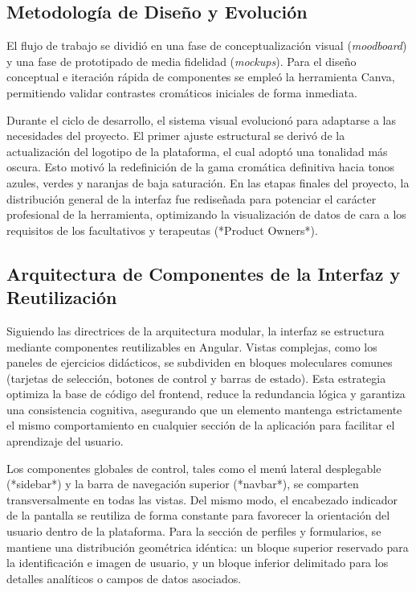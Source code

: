\subsection{Metodología de Diseño y Evolución}
El flujo de trabajo se dividió en una fase de conceptualización visual (\textit{moodboard}) y una fase de prototipado de media fidelidad (\textit{mockups}). Para el diseño conceptual e iteración rápida de componentes se empleó la herramienta Canva, permitiendo validar contrastes cromáticos iniciales de forma inmediata.

Durante el ciclo de desarrollo, el sistema visual evolucionó para adaptarse a las necesidades del proyecto. El primer ajuste estructural se derivó de la actualización del logotipo de la plataforma, el cual adoptó una tonalidad más oscura. Esto motivó la redefinición de la gama cromática definitiva hacia tonos azules, verdes y naranjas de baja saturación. En las etapas finales del proyecto, la distribución general de la interfaz fue rediseñada para potenciar el carácter profesional de la herramienta, optimizando la visualización de datos de cara a los requisitos de los facultativos y terapeutas (*Product Owners*).

\subsection{Arquitectura de Componentes de la Interfaz y Reutilización}
Siguiendo las directrices de la arquitectura modular, la interfaz se estructura mediante componentes reutilizables en Angular. Vistas complejas, como los paneles de ejercicios didácticos, se subdividen en bloques moleculares comunes (tarjetas de selección, botones de control y barras de estado). Esta estrategia optimiza la base de código del frontend, reduce la redundancia lógica y garantiza una consistencia cognitiva, asegurando que un elemento mantenga estrictamente el mismo comportamiento en cualquier sección de la aplicación para facilitar el aprendizaje del usuario.

Los componentes globales de control, tales como el menú lateral desplegable (*sidebar*) y la barra de navegación superior (*navbar*), se comparten transversalmente en todas las vistas. Del mismo modo, el encabezado indicador de la pantalla se reutiliza de forma constante para favorecer la orientación del usuario dentro de la plataforma. Para la sección de perfiles y formularios, se mantiene una distribución geométrica idéntica: un bloque superior reservado para la identificación e imagen de usuario, y un bloque inferior delimitado para los detalles analíticos o campos de datos asociados.

